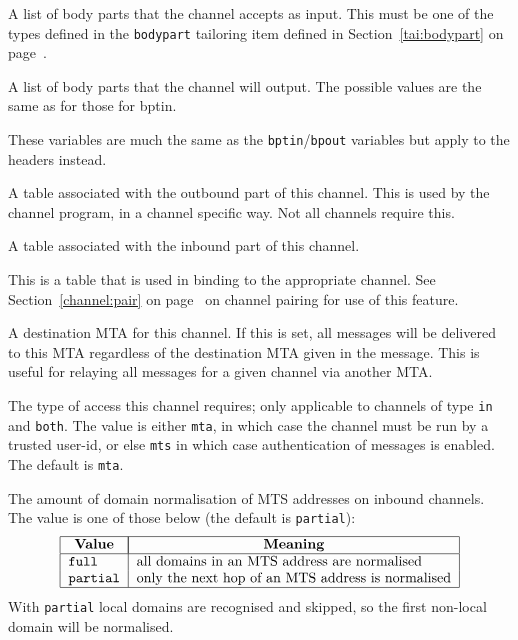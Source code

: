 \begin{describe}
\item[\verb+bptin=value+:]
A list of body parts that the channel accepts as input. 
This must be one of the
types defined in the \verb|bodypart| tailoring item defined in
Section~\ref{tai:bodypart} on page~\pageref{tai:bodypart}.

\item[\verb+bptout=value+:]
A list of body parts that the channel will output.  The possible
values are the same as for those for bptin.

\item[\verb|hdrin=value|/\verb|hdrout=value|:]
These variables are much the same as the \verb|bptin|/\verb|bpout|
variables but apply to the headers instead.

\item[\verb+outtable=value+:]
A table associated with the outbound part of this channel. This is
used by the channel program, in a channel specific way. Not all
channels require this.

\item[\verb|intable=value|:]
A table associated with the inbound part of this channel.

\item[\verb+mtatable=value+:]
This is a table that is used in binding to the appropriate channel. See
Section~\ref{channel:pair} on page~\pageref{channel:pair}
on channel pairing for use of this feature.

\item[\verb+mta=value+:]
A destination MTA for this channel. If this is set, all messages will
be delivered to this MTA regardless of the destination MTA given in
the message. This is useful for relaying all messages for a given
channel via another MTA.

\item[\verb+access=value+:]
The type of access this channel requires; only applicable to channels
of type \verb|in| and \verb|both|. The value is either \verb+mta+, in
which case the channel must be run by a trusted user-id, or else
\verb+mts+ in which case authentication of messages is enabled. The
default is \verb|mta|.

\item[\verb+domain-norm=value+:]
The amount of domain normalisation of MTS addresses on inbound
channels.  The value is one of those below (the default is
\verb+partial+):
\[\begin{tabular}{|l|l|}
\hline
	\multicolumn{1}{|c|}{\bf Value} &
		\multicolumn{1}{|c|}{\bf Meaning}\\
\hline
	\tt	full&		all domains in an MTS address are normalised\\
	\tt	partial&	only the next hop of an MTS address is normalised\\
\hline
\end{tabular}\]
With \verb|partial| local domains are recognised and skipped, so the
first non-local domain will be normalised.


\end{describe}
